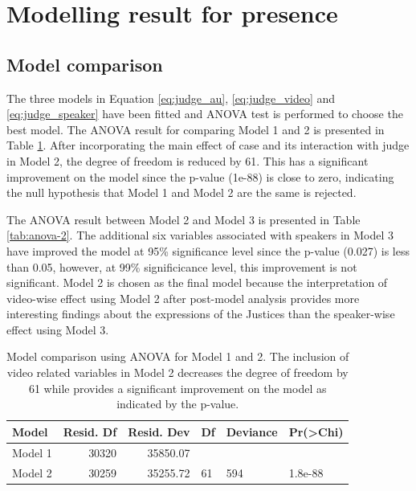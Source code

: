 \documentclass{monashthesis}
\begin{document}
\hypertarget{modelling-result-for-presence}{%
\section{Modelling result for presence}\label{modelling-result-for-presence}}

\hypertarget{model-comparison-1}{%
\subsection{Model comparison}\label{model-comparison-1}}

The three models in Equation \ref{eq:judge_au}, \ref{eq:judge_video} and \ref{eq:judge_speaker} have been fitted and ANOVA test is performed to choose the best model. The ANOVA result for comparing Model 1 and 2 is presented in Table \ref{tab:anova-1}. After incorporating the main effect of case and its interaction with judge in Model 2, the degree of freedom is reduced by 61. This has a significant improvement on the model since the p-value (1e-88) is close to zero, indicating the null hypothesis that Model 1 and Model 2 are the same is rejected.

The ANOVA result between Model 2 and Model 3 is presented in Table \ref{tab:anova-2}. The additional six variables associated with speakers in Model 3 have improved the model at 95\% significance level since the p-value (0.027) is less than 0.05, however, at 99\% significicance level, this improvement is not significant. Model 2 is chosen as the final model because the interpretation of video-wise effect using Model 2 after post-model analysis provides more interesting findings about the expressions of the Justices than the speaker-wise effect using Model 3.

\begin{table}[ht]
\begin{center}
\caption{\label{tab:anova-1}Model comparison using ANOVA for Model 1 and 2. The inclusion of video related variables in Model 2 decreases the degree of freedom by 61 while provides a significant improvement on the model as indicated by the p-value. }
\begin{tabular}{lrrlll}
\toprule
Model & Resid. Df & Resid. Dev & Df & Deviance & Pr(>Chi) \\
\midrule
Model 1 & 30320 & 35850.07 &   &   &   \\
Model 2 & 30259 & 35255.72 & 61 & 594 & 1.8e-88 \\
\bottomrule
\end{tabular}
\end{center}
\end{table}
\end{document}
